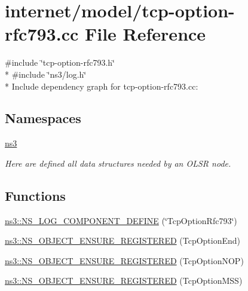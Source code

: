 \hypertarget{tcp-option-rfc793_8cc}{}\section{internet/model/tcp-\/option-\/rfc793.cc File Reference}
\label{tcp-option-rfc793_8cc}
{\ttfamily \#include \char`\"{}tcp-\/option-\/rfc793.\+h\char`\"{}}\\*
{\ttfamily \#include \char`\"{}ns3/log.\+h\char`\"{}}\\*
Include dependency graph for tcp-\/option-\/rfc793.cc\+:
\subsection*{Namespaces}
\begin{DoxyCompactItemize}
\item 
 \hyperlink{namespacens3}{ns3}
\begin{DoxyCompactList}\small\item\em Here are defined all data structures needed by an O\+L\+SR node. \end{DoxyCompactList}\end{DoxyCompactItemize}
\subsection*{Functions}
\begin{DoxyCompactItemize}
\item 
\hyperlink{namespacens3_acfa9ba58965bb35092501bbd60d30972}{ns3\+::\+N\+S\+\_\+\+L\+O\+G\+\_\+\+C\+O\+M\+P\+O\+N\+E\+N\+T\+\_\+\+D\+E\+F\+I\+NE} (\char`\"{}Tcp\+Option\+Rfc793\char`\"{})
\item 
\hyperlink{namespacens3_a923d85eaca44488c356f1ea13f3176ff}{ns3\+::\+N\+S\+\_\+\+O\+B\+J\+E\+C\+T\+\_\+\+E\+N\+S\+U\+R\+E\+\_\+\+R\+E\+G\+I\+S\+T\+E\+R\+ED} (Tcp\+Option\+End)
\item 
\hyperlink{namespacens3_a7dc320cce2b814e6427ca6f0cc2ecbb2}{ns3\+::\+N\+S\+\_\+\+O\+B\+J\+E\+C\+T\+\_\+\+E\+N\+S\+U\+R\+E\+\_\+\+R\+E\+G\+I\+S\+T\+E\+R\+ED} (Tcp\+Option\+N\+OP)
\item 
\hyperlink{namespacens3_a0f1b00a8598e62a01a721040e20c65ab}{ns3\+::\+N\+S\+\_\+\+O\+B\+J\+E\+C\+T\+\_\+\+E\+N\+S\+U\+R\+E\+\_\+\+R\+E\+G\+I\+S\+T\+E\+R\+ED} (Tcp\+Option\+M\+SS)
\end{DoxyCompactItemize}
